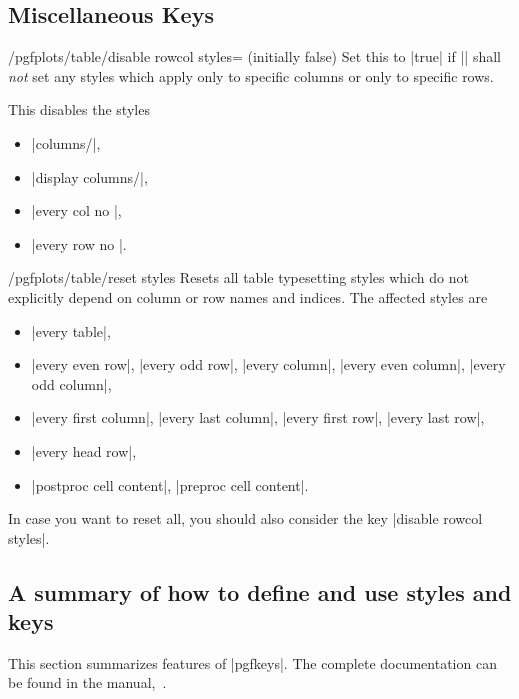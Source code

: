 \subsection{Miscellaneous Keys}

\begin{key}{/pgfplots/table/disable rowcol styles= (initially false)}
    Set this to |true| if |\pgfplotstabletypeset| shall \emph{not} set any
    styles which apply only to specific columns or only to specific rows.

    This disables the styles
    \begin{itemize}
        \item |columns/|,
        \item |display columns/|,
        \item |every col no |,
        \item |every row no |.
    \end{itemize}
\end{key}

\begin{key}{/pgfplots/table/reset styles}
    Resets all table typesetting styles which do not explicitly depend on
    column or row names and indices. The affected styles are
    \begin{itemize}
        \item |every table|,
        \item |every even row|, |every odd row|, |every column|,
            |every even column|, |every odd column|,
        \item |every first column|, |every last column|, |every first row|,
            |every last row|,
        \item |every head row|,
        \item |postproc cell content|, |preproc cell content|.
    \end{itemize}
    In case you want to reset all, you should also consider the key
    |disable rowcol styles|.
\end{key}


\subsection{A summary of how to define and use styles and keys}

This section summarizes features of |pgfkeys|. The complete documentation can
be found in the \pgfname{} manual,~\cite{tikz}.

